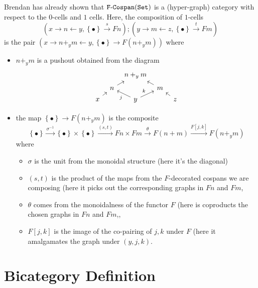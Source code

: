 \documentclass[10pt,a4paper]{article}
\newcommand{\cat}[1]{\mathtt{#1}}
\renewcommand{\t}[1]{\textup{#1}}
\newcommand{\xto}[1]{\xrightarrow{#1}}
\newcommand{\unto}{\leftarrow}
\renewcommand{\(}{\left(}
\renewcommand{\)}{\right)}
\renewcommand{\{}{\left\lbrace}
\renewcommand{\}}{\right\rbrace}
\theoremstyle{remark}
\theoremstyle{definition}
\begin{document}
Brendan has already shown that $\cat{F\t{-}Cospan(Set)}$ is a (hyper-graph) category with respect to the $0$-cells and $1$ cells.  Here, the composition of $1$-cells 
\[
	(x \to n \unto y , \{\bullet\} \xto{s} Fn ) ; (y \to m \unto z , \{\bullet\} \xto{t} Fm
)
\]
is the pair $(x \to n +_y m \unto y , \{ \bullet \} \to F(n +_y m))$ where 
\begin{itemize}
	\item $n +_y m$ is a pushout obtained from the diagram
\[
	\begin{tikzcd}[row sep = tiny,column sep = tiny]
		{} &
		{} &
		n +_y m	&
		{} &
		{} \\
		{} &
		n \arrow[]{ur}{ } &
		{} &
		m \arrow[]{ul}{ } &
		{} \\
		x	\arrow[]{ur}{ } &
		{} &
		y \arrow[]{ul}{j} \arrow[]{ur}{k}&
		{}&
		z \arrow[]{ul}{ }
	\end{tikzcd}
\]  
	\item the map $\{\bullet\} \to F(n +_y m)$ is the composite
\[
	\{\bullet\} \xto{\sigma^{-1}}
	\{\bullet\} \times \{\bullet\} \xto{(s,t)}
	Fn \times Fm \xto{\theta}
	F(n + m) \xto{F[j,k]}
	F(n +_y m) 
\]
where 
\begin{itemize}
	\item $\sigma$ is the unit from the monoidal structure (here it's the diagonal)
	\item $(s,t)$ is the product of the maps from the $F$-decorated cospans we are composing (here it picks out the corresponding graphs in $Fn$ and $Fm$,
	\item $\theta$ comes from the monoidalness of the functor $F$ (here is coproducts the chosen graphs in $Fn$ and $Fm$,,
	\item $F[j,k]$ is the image of the co-pairing of $j,k$ under $F$ (here it amalgamates the graph under $(y,j,k)$. 
\end{itemize}
\end{itemize}


\section*{Bicategory Definition}
\end{document}

